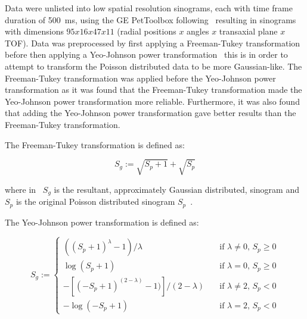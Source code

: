                 Data were unlisted into low spatial resolution sinograms, each with time frame duration of \SI{500}{\milli\second}, using the \gls{GE} PetToolbox following~ resulting in sinograms with dimensions $95 x 16 x 47 x 11$ (radial positions $x$ angles $x$ transaxial plane $x$ \gls{TOF}). Data was preprocessed by first applying a Freeman-Tukey transformation~ before then applying a Yeo-Johnson power transformation~ this is in order to attempt to transform the Poisson distributed data to be more Gaussian-like. The Freeman-Tukey transformation was applied before the Yeo-Johnson power transformation as it was found that the Freeman-Tukey transformation made the Yeo-Johnson power transformation more reliable. Furthermore, it was also found that adding the Yeo-Johnson power transformation gave better results than the Freeman-Tukey transformation.
                
                The Freeman-Tukey transformation is defined as:

                \begin{equation} \label{eq:pca_data_driven_surrogate_signal_extraction_methods_for_dynamic_pet_methods_freeman_tukey}
                    S_g := \sqrt{S_p + 1} + \sqrt{S_p}
                \end{equation}

                \noindent where in~ $S_g$ is the resultant, approximately Gaussian distributed, sinogram and $S_p$ is the original Poisson distributed sinogram $S_p$~.
                
                The Yeo-Johnson power transformation is defined as:

                \begin{equation} \label{eq:pca_data_driven_surrogate_signal_extraction_methods_for_dynamic_pet_methods_yeo_johnson}
                    S_g := \begin{cases}
                                ((S_p + 1)^\lambda - 1) / \lambda                   & \quad \text{if } \lambda \neq 0 \text{, } S_p \geq 0 \\
                                \log(S_p + 1)                                       & \quad \text{if } \lambda = 0 \text{, } S_p \geq 0    \\
                                -[(-S_p + 1)^{(2 - \lambda)} - 1)] / (2 - \lambda)  & \quad \text{if } \lambda \neq 2 \text{, } S_p < 0    \\
                                -\log(-S_p + 1)                                     & \quad \text{if } \lambda = 2 \text{, } S_p < 0
                            \end{cases}
                \end{equation}

